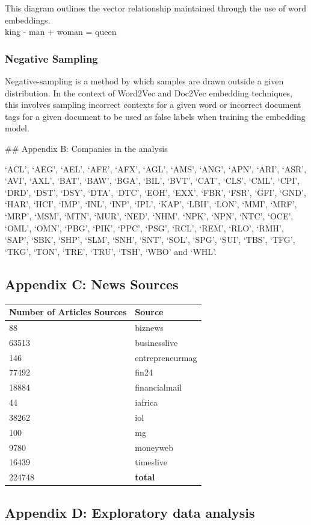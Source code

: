 \documentclass[11pt]{article}
\begin{document}
This diagram outlines the vector relationship maintained through the use
of word embeddings.\\
king - man + woman = queen

\hypertarget{negative-sampling}{%
\subsubsection{Negative Sampling}\label{negative-sampling}}

Negative-sampling is a method by which samples are drawn outside a given
distribution. In the context of Word2Vec and Doc2Vec embedding
techniques, this involves sampling incorrect contexts for a given word
or incorrect document tags for a given document to be used as false
labels when training the embedding model.

\#\# Appendix B: Companies in the analysis

`ACL', `AEG', `AEL', `AFE', `AFX', `AGL', `AMS', `ANG', `APN', `ARI',
`ASR', `AVI', `AXL', `BAT', `BAW', `BGA', `BIL', `BVT', `CAT', `CLS',
`CML', `CPI', `DRD', `DST', `DSY', `DTA', `DTC', `EOH', `EXX', `FBR',
`FSR', `GFI', `GND', `HAR', `HCI', `IMP', `INL', `INP', `IPL', `KAP',
`LBH', `LON', `MMI', `MRF', `MRP', `MSM', `MTN', `MUR', `NED', `NHM',
`NPK', `NPN', `NTC', `OCE', `OML', `OMN', `PBG', `PIK', `PPC', `PSG',
`RCL', `REM', `RLO', `RMH', `SAP', `SBK', `SHP', `SLM', `SNH', `SNT',
`SOL', `SPG', `SUI', `TBS', `TFG', `TKG', `TON', `TRE', `TRU', `TSH',
`WBO' and `WHL'.

\hypertarget{appendix-c-news-sources}{%
\subsection{Appendix C: News Sources}\label{appendix-c-news-sources}}

\begin{longtable}[]{@{}ll@{}}
\toprule
Number of Articles Sources & Source\tabularnewline
\midrule
\endhead
88 & biznews\tabularnewline
63513 & businesslive\tabularnewline
146 & entrepreneurmag\tabularnewline
77492 & fin24\tabularnewline
18884 & financialmail\tabularnewline
44 & iafrica\tabularnewline
38262 & iol\tabularnewline
100 & mg\tabularnewline
9780 & moneyweb\tabularnewline
16439 & timeslive\tabularnewline
224748 & \textbf{total}\tabularnewline
\bottomrule
\end{longtable}

\hypertarget{appendix-d-exploratory-data-analysis}{%
\subsection{Appendix D: Exploratory data
analysis}\label{appendix-d-exploratory-data-analysis}}
\end{document}
